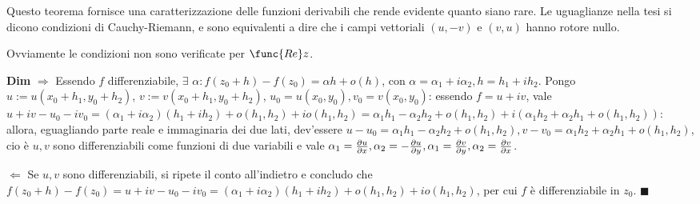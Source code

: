 \documentclass{article}
\begin{document}
Questo teorema fornisce una caratterizzazione delle funzioni derivabili che
rende evidente quanto siano rare. Le uguaglianze nella tesi si dicono
condizioni di Cauchy-Riemann, e sono equivalenti a dire che i campi
vettoriali $\left( u,-v\right) $ e $\left( v,u\right) $ hanno rotore nullo.

Ovviamente le condizioni non sono verificate per $\func{Re}z$.

\textbf{Dim} $\Longrightarrow $ Essendo $f$ differenziabile, $\exists $ $%
\alpha :f\left( z_{0}+h\right) -f\left( z_{0}\right) =\alpha h+o\left(
h\right) $, con $\alpha =\alpha _{1}+i\alpha _{2},h=h_{1}+ih_{2}$. Pongo $%
u:=u\left( x_{0}+h_{1},y_{0}+h_{2}\right) $, $v:=v\left(
x_{0}+h_{1},y_{0}+h_{2}\right) $, $u_{0}=u\left( x_{0},y_{0}\right)
,v_{0}=v\left( x_{0},y_{0}\right) $: essendo $f=u+iv$, vale $%
u+iv-u_{0}-iv_{0}=\left( \alpha _{1}+i\alpha _{2}\right) \left(
h_{1}+ih_{2}\right) +o\left( h_{1},h_{2}\right) +io\left( h_{1},h_{2}\right)
=\alpha _{1}h_{1}-\alpha _{2}h_{2}+o\left( h_{1},h_{2}\right) +i\left(
\alpha _{1}h_{2}+\alpha _{2}h_{1}+o\left( h_{1},h_{2}\right) \right) $:
allora, eguagliando parte reale e immaginaria dei due lati, dev'essere $%
u-u_{0}=\alpha _{1}h_{1}-\alpha _{2}h_{2}+o\left( h_{1},h_{2}\right)
,v-v_{0}=\alpha _{1}h_{2}+\alpha _{2}h_{1}+o\left( h_{1},h_{2}\right) $, cio%
\`{e} $u,v$ sono differenziabili come funzioni di due variabili e vale $%
\alpha _{1}=\frac{\partial u}{\partial x},\alpha _{2}=-\frac{\partial u}{%
\partial y},\alpha _{1}=\frac{\partial v}{\partial y},\alpha _{2}=\frac{%
\partial v}{\partial x}$.

$\Longleftarrow $ Se $u,v$ sono differenziabili, si ripete il conto
all'indietro e concludo che $f\left( z_{0}+h\right) -f\left( z_{0}\right)
=u+iv-u_{0}-iv_{0}=\left( \alpha _{1}+i\alpha _{2}\right) \left(
h_{1}+ih_{2}\right) +o\left( h_{1},h_{2}\right) +io\left( h_{1},h_{2}\right) 
$, per cui $f$ \`{e} differenziabile in $z_{0}$. $\blacksquare $
\end{document}
